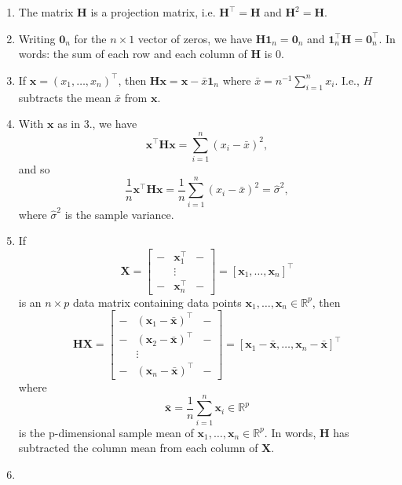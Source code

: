 \documentclass[]{book}
\providecommand{\tightlist}{%
  \setlength{\itemsep}{0pt}\setlength{\parskip}{0pt}}
\theoremstyle{definition}
\theoremstyle{definition}
\theoremstyle{definition}
\theoremstyle{remark}
\begin{document}
\begin{enumerate}
\def\labelenumi{\arabic{enumi}.}
\tightlist
\item
  The matrix \(\boldsymbol H\) is a projection matrix, i.e. \(\boldsymbol H^\top =\boldsymbol H\) and \(\boldsymbol H^2=\boldsymbol H\).
\item
  Writing \({\mathbf 0}_n\) for the \(n \times 1\) vector of zeros, we have
  \(\boldsymbol H{\mathbf 1}_n={\mathbf 0}_n\) and \({\mathbf 1}_n^\top \boldsymbol H={\mathbf 0}_n^\top.\) In words: the sum of each row and each column of \(\boldsymbol H\) is \(0\).
\item
  If \(\boldsymbol x=(x_1, \ldots , x_n)^\top\), then \(\boldsymbol H\boldsymbol x= \boldsymbol x- \bar{x}{\mathbf 1}_n\) where \(\bar{x}=n^{-1}\sum_{i=1}^n x_i\). I.e., \(H\) subtracts the mean \(\bar{x}\) from \(\boldsymbol x\).
\item
  With \(\boldsymbol x\) as in 3., we have
  \[
  \boldsymbol x^\top \boldsymbol H\boldsymbol x= \sum_{i=1}^n (x_i-\bar{x})^2,
  \]
  and so
  \[
  \frac{1}{n}\boldsymbol x^\top \boldsymbol H\boldsymbol x=\frac{1}{n}\sum_{i=1}^n (x_i-\bar{x})^2 = \hat{\sigma}^2,
  \]
  where \(\hat{\sigma}^2\) is the sample variance.
\item
  If
  \[\boldsymbol X=\left[\begin{array}{ccc}-&\boldsymbol x_1^\top&-\\ 
  &\vdots& \\ -&\boldsymbol x_n^\top&-\end{array}\right] = [\boldsymbol x_1, \ldots, \boldsymbol x_n]^\top\]
  is an \(n \times p\) data matrix containing data points \(\boldsymbol x_1, \ldots, \boldsymbol x_n\in \mathbb{R}^p\), then
  \[
  \boldsymbol H\boldsymbol X=\left[ \begin{array}{ccc}
  -&(\boldsymbol x_1-\bar{\boldsymbol x})^\top&-\\
  -&(\boldsymbol x_2 -\bar{\boldsymbol x})^\top&-\\
  &\vdots&\\
  -&(\boldsymbol x_n - \bar{\boldsymbol x})^\top&-
  \end{array}\right ]= \left[ \boldsymbol x_1 -\bar{\boldsymbol x}, \ldots , \boldsymbol x_n-\bar{\boldsymbol x}\right]^\top
  \]
  where \[\bar{\boldsymbol x} = \frac{1}{n} \sum_{i=1}^n \boldsymbol x_i \in \mathbb{R}^p\]
  is the p-dimensional sample mean of \(\boldsymbol x_1, \ldots, \boldsymbol x_n\in \mathbb{R}^p\). In words, \(\boldsymbol H\) has subtracted the column mean from each column of \(\boldsymbol X\).
\item

\end{enumerate}
\end{document}
